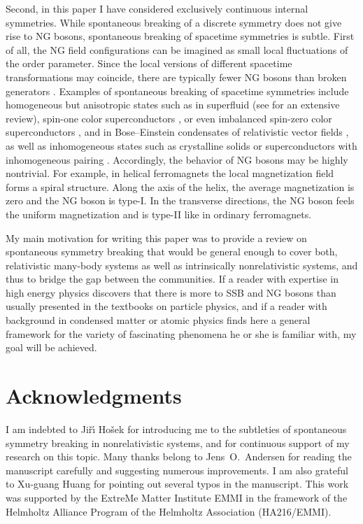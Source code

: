 \documentclass[final,2p,times,12pt,sort&compress]{elsarticle}
\begin{document}
Second, in this paper I have considered exclusively continuous internal
symmetries. While spontaneous breaking of a discrete symmetry does not give
rise to NG bosons, spontaneous breaking of spacetime symmetries is subtle.
First of all, the NG field configurations can be imagined as small local
fluctuations of the order parameter. Since the local versions of different
spacetime transformations may coincide, there are typically fewer NG bosons
than broken generators \cite{Low:2001bw}. Examples of spontaneous breaking of
spacetime symmetries include homogeneous but anisotropic states
such as in superfluid  (see \cite{Vollhardt:1990vw} for an
extensive review), spin-one color superconductors \cite{Schmitt:2004et}, or even
imbalanced spin-zero color superconductors \cite{Muther:2002ej}, and in
Bose--Einstein condensates of relativistic vector fields
\cite{Sannino:2001fd,Gusynin:2003yu}, as well as inhomogeneous states such as
crystalline solids \cite{Leutwyler:1996er} or superconductors with inhomogeneous
pairing \cite{Casalbuoni:2003wh}. Accordingly, the behavior of NG bosons may be
highly nontrivial. For example, in helical ferromagnets
\cite{Dzyaloshinsky:1958dz,Moriya:1960mo} the local magnetization field forms a
spiral structure. Along the axis of the helix, the average magnetization is zero
and the NG boson is type-I. In the transverse directions, the NG boson feels the
uniform magnetization and is type-II like in ordinary ferromagnets.

My main motivation for writing this paper was to provide a review on
spontaneous symmetry breaking that would be general enough to cover both,
relativistic many-body systems as well as intrinsically nonrelativistic systems,
and thus to bridge the gap between the communities. If a reader with expertise
in high energy physics discovers that there is more to SSB and NG bosons than
usually presented in the textbooks on particle physics, and if a reader with
background in condensed matter or atomic physics finds here a general framework
for the variety of fascinating phenomena he or she is familiar with, my goal
will be achieved.


\section*{Acknowledgments}
I am indebted to Ji\v{r}\'{\i} Ho\v{s}ek for introducing me to the subtleties
of spontaneous symmetry breaking in nonrelativistic systems, and for continuous
support of my research on this topic. Many thanks belong to Jens~O.~Andersen for
reading the manuscript carefully and suggesting numerous improvements. I am
also grateful to Xu-guang Huang for pointing out several typos in the
manuscript. This work was supported by the ExtreMe Matter Institute EMMI in the
framework of the Helmholtz Alliance Program of the Helmholtz Association
(HA216/EMMI).




\end{document}
